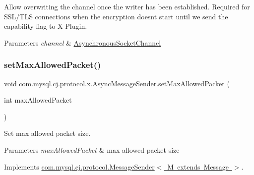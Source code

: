 Allow overwriting the channel once the writer has been established. Required for S\+S\+L/\+T\+LS connections when the encryption doesn\textquotesingle{}t start until we send the capability flag to X Plugin.


\begin{DoxyParams}{Parameters}
{\em channel} & \mbox{\hyperlink{}{Asynchronous\+Socket\+Channel}} \\
\hline
\end{DoxyParams}
\mbox{\label{classcom_1_1mysql_1_1cj_1_1protocol_1_1x_1_1_async_message_sender_a9350fb34edd02d90eebe96812dd85e25}} 
\subsubsection{\texorpdfstring{set\+Max\+Allowed\+Packet()}{setMaxAllowedPacket()}}
{\footnotesize\ttfamily void com.\+mysql.\+cj.\+protocol.\+x.\+Async\+Message\+Sender.\+set\+Max\+Allowed\+Packet (\begin{DoxyParamCaption}\item[{int}]{max\+Allowed\+Packet }\end{DoxyParamCaption})}

Set max allowed packet size.


\begin{DoxyParams}{Parameters}
{\em max\+Allowed\+Packet} & max allowed packet size \\
\hline
\end{DoxyParams}


Implements \mbox{\hyperlink{interfacecom_1_1mysql_1_1cj_1_1protocol_1_1_message_sender_a31345b7817dcc7e982bb96dba97b3a01}{com.\+mysql.\+cj.\+protocol.\+Message\+Sender$<$ M extends Message $>$}}.

\mbox{\label{classcom_1_1mysql_1_1cj_1_1protocol_1_1x_1_1_async_message_sender_a4e7623346f23221fb9ff562c11c851e6}} 
